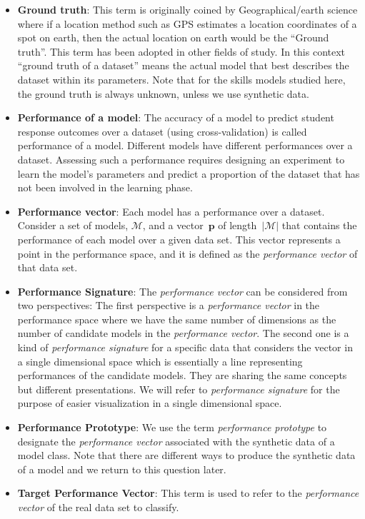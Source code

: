 \begin{itemize}
\item \textbf{Ground truth}: This term is originally coined by Geographical/earth science where if a location method such as GPS estimates a location coordinates of a spot on earth, then the actual location on earth would be the ``Ground truth''. This term has been adopted in other fields of study. In this context ``ground truth of a dataset'' means the actual model that best describes the dataset within its parameters.  Note that for the skills models studied here, the ground truth is always unknown, unless we use synthetic data.
\item \textbf{Performance of a model}: The accuracy of a model to predict student response outcomes over a dataset (using cross-validation) is called performance of a model.  Different models have different performances over a dataset. Assessing such a performance requires designing an experiment to learn the model's parameters and predict a proportion of the dataset that has not been involved in the learning phase.
\item \textbf{Performance vector}: Each model has a performance over a dataset. Consider a set of models, $\mathcal{M}$, and a vector~$\mathbf{p}$ of length~$|\mathcal{M}|$ that contains the performance of each model over a given data set.  This vector represents a point in the performance space, and it is defined as the \textit{performance vector} of that data set.

\item \textbf{Performance Signature}: The \textit{performance vector} can be considered from two perspectives: The first perspective is a \textit{performance vector} in the performance space where we have the same number of dimensions as the number of candidate models in the \textit{performance vector}. The second one is a kind of \textit{performance signature} for a specific data that considers the vector in a single dimensional space which is essentially a line representing performances of the candidate models.  They are sharing the same concepts but different presentations. We will refer to \textit{performance signature} for the purpose of easier visualization in a single dimensional space.

\item \textbf{Performance Prototype}: We use the term \textit{performance prototype} to designate the \textit{performance vector} associated with the synthetic data of a model class.  Note that there are different ways to produce the synthetic data of a model and we return to this question later.

\item \textbf{Target Performance Vector}: This term is used to refer to the \textit{performance vector} of the real data set to classify.


\end{itemize}

